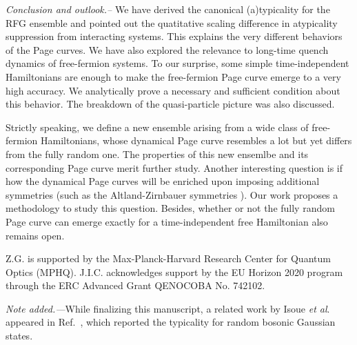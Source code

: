 \documentclass[twocolumn,english,prl,aps,superscriptaddress,amsmath,amssymb,floatfix]{revtex4-2}
\begin{document}
\emph{Conclusion and outlook.--}%
We have derived the canonical
(a)typicality for the RFG ensemble %
and pointed out the quatitative %
scaling difference in atypicality suppression %
from %
interacting systems. This %
explains the very different behaviors of the Page curves. %
We have also explored the relevance to long-time quench dynamics of %
free-fermion systems. %
To our surprise, some simple time-independent
Hamiltonians are enough to 
make %
the free-fermion Page curve %
emerge to a very high accuracy. 
We %
analytically prove a necessary and sufficient condition about this behavior. The breakdown %
of the quasi-particle picture was also discussed.

Strictly speaking, we define a new %
ensemble arising from %
a wide class of free-fermion Hamiltonians, whose dynamical Page curve resembles a lot but yet differs from %
the fully random one. %
The properties of this new ensemlbe and its corresponding Page curve %
merit further study. Another interesting question is if how the %
dynamical Page curves will be enriched upon imposing %
additional symmetries (such as the Altland-Zirnbauer symmetries \cite{Altland1997}). %
Our work proposes a methodology to study this question. Besides, whether
or not the fully random Page curve can emerge exactly for a time-independent free Hamiltonian %
also remains open.

Z.G. is supported by the Max-Planck-Harvard Research Center for Quantum Optics (MPHQ). J.I.C. acknowledges support by the EU Horizon 2020 program through the ERC Advanced Grant QENOCOBA No. 742102.

\emph{Note added.---}While finalizing this manuscript, a related
work by Isoue \emph{et al}. appeared in Ref.~\cite{Iosue2022}, which reported the typicality for random bosonic Gaussian states.






\end{document}
